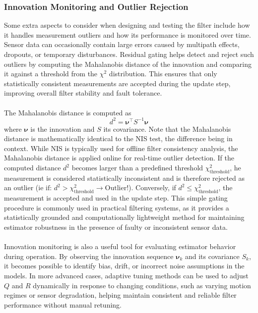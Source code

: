 \subsubsection{Innovation Monitoring and Outlier Rejection}
Some extra aspects to consider when designing and testing the filter include how it handles measurement outliers and how its performance is monitored over time. Sensor data can occasionally contain large errors caused by multipath effects, dropouts, or temporary disturbances. Residual gating helps detect and reject such outliers by computing the Mahalanobis distance of the innovation and comparing it against a threshold from the $\chi^2$ distribution. This ensures that only statistically consistent measurements are accepted during the update step, improving overall filter stability and fault tolerance.  
\\ \\
The Mahalanobis distance is computed as
$$
    d^2 = \boldsymbol{\nu}^\top S^{-1} \boldsymbol{\nu}
$$
where $\boldsymbol{\nu}$ is the innovation and $S$ its covariance. Note that the Mahalanobis distance is mathematically identical to the NIS test, the difference being in context. While NIS is typically used for offline filter consistency analysis, the Mahalanobis distance is applied online for real-time outlier detection. If the computed distance $d^2$ becomes larger than a predefined threshold $\chi^2_{\text{threshold}}$, he measurement is considered statistically inconsistent and is therefore rejected as an outlier (ie $\text{if}: \, d^2 > \chi^2_{\text{threshold}} \rightarrow \text{Outlier!}$). Conversely, if $d^2 \le \chi^2_{\text{threshold}}$, the measurement is accepted and used in the update step. This simple gating procedure is commonly used in practical filtering systems, as it provides a statistically grounded and computationally lightweight method for maintaining estimator robustness in the presence of faulty or inconsistent sensor data.
\\ \\
Innovation monitoring is also a useful tool for evaluating estimator behavior during operation. By observing the innovation sequence $\boldsymbol{\nu}_k$ and its covariance $S_k$, it becomes possible to identify bias, drift, or incorrect noise assumptions in the models. In more advanced cases, adaptive tuning methods can be used to adjust $Q$ and $R$ dynamically in response to changing conditions, such as varying motion regimes or sensor degradation, helping maintain consistent and reliable filter performance without manual retuning.



